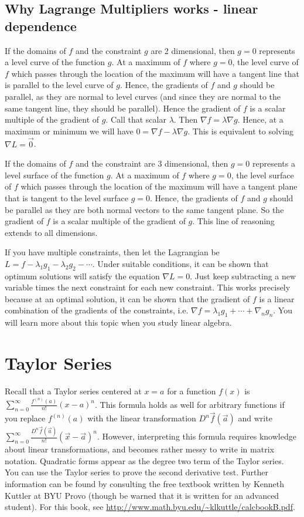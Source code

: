 \subsection{Why Lagrange Multipliers works - linear dependence}
If the domains of {$f$} and the constraint $g$ are 2 dimensional, then
{$g=0$} represents a level curve of the function {$g$}. At a maximum
of {$f$} where {$g=0$}, the level curve of {$f$} which passes through
the location of the maximum will have a tangent line that is parallel
to the level curve of {$g$}.  Hence, the gradients of {$f$} and {$g$}
should be parallel, as they are normal to level curves (and since they
are normal to the same tangent line, they should be parallel). Hence
the gradient of {$f$} is a scalar multiple of the gradient of {$g$}. 
Call that scalar {$\lambda$}.  Then {$\nabla f=\lambda\nabla g$}. Hence, at a maximum or
minimum we will have {$0=\nabla f-\lambda\nabla g$}.  This is equivalent to solving 
{$\nabla L =\vec 0$}.


If the domains of {$f$} and the constraint are 3 dimensional, then
{$g=0$} represents a level surface of the function {$g$}. At a maximum
of {$f$} where {$g=0$}, the level surface of {$f$} which passes
through the location of the maximum will have a tangent plane that is
tangent to the level surface {$g=0$}.  Hence, the gradients of {$f$}
and {$g$} should be parallel as they are both normal vectors to the
same tangent plane.  So the gradient of {$f$} is a scalar multiple of
the gradient of {$g$}.  This line of reasoning extends to all
dimensions.


If you have multiple constraints, then let the Lagrangian be
{$L=f-\lambda_1g_1-\lambda_2g_2-\cdots$}. Under suitable conditions,
it can be shown that optimum solutions will satisfy the equation
{$\nabla L = 0$}. Just keep subtracting a new variable times the next
constraint for each new constraint. This works precisely because at an
optimal solution, it can be shown that the gradient of $f$ is a linear
combination of the gradients of the constraints, i.e. $\nabla f =
\lambda_1g_1+\cdots +\nabla_ng_n$. You will learn more about this
topic when you study linear algebra.

\section{Taylor Series}
Recall that a Taylor series centered at $x=a$ for a function $f(x)$ is
$\sum_{n=0}^{\infty}\frac{f^{(n)}(a)}{n!}(x-a)^n$.  This formula holds as well
for arbitrary functions if you replace $f^{(n)}(a)$ with the linear
transformation $D^n\vec f(\vec a)$ and write $\sum_{n=0}^{\infty}\frac{D^n\vec
  f(\vec a)}{n!}(\vec x-\vec a)^n$. However, interpreting this formula
requires knowledge about linear transformations, and becomes rather
messy to write in matrix notation. Quadratic forms appear as the
degree two term of the Taylor series.  You can use the Taylor series
to prove the second derivative test.  Further information can be found
by consulting the free textbook written by Kenneth Kuttler at BYU
Provo (though be warned that it is written for an advanced student).
For this book, see
\url{http://www.math.byu.edu/~klkuttle/calcbookB.pdf}.











